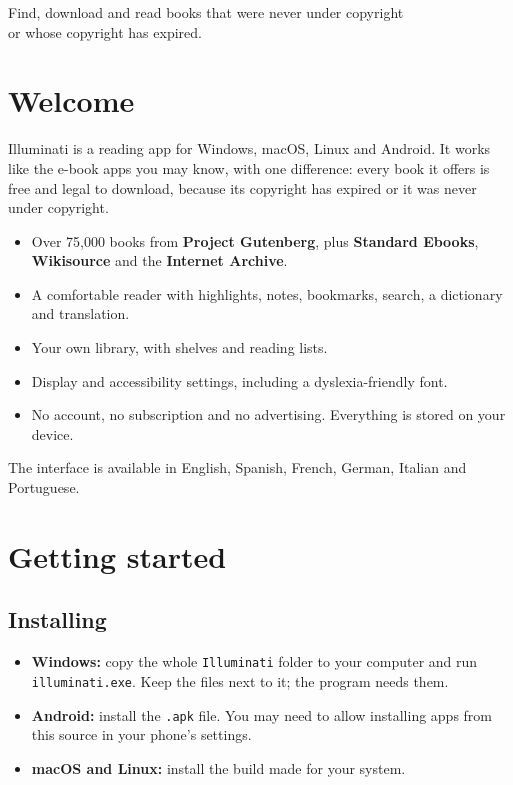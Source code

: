 \documentclass[11pt]{article}
\begin{document}
%
  {Find, download and read books that were never under copyright\\or whose copyright has expired.}

{\setcounter{tocdepth}{1}\tableofcontents}
\newpage

\section{Welcome}

Illuminati is a reading app for Windows, macOS, Linux and Android. It works like the e-book
apps you may know, with one difference: every book it offers is free and legal to download,
because its copyright has expired or it was never under copyright.

\begin{itemize}
  \item Over 75,000 books from \textbf{Project Gutenberg}, plus \textbf{Standard Ebooks},
        \textbf{Wikisource} and the \textbf{Internet Archive}.
  \item A comfortable reader with highlights, notes, bookmarks, search, a dictionary and
        translation.
  \item Your own library, with shelves and reading lists.
  \item Display and accessibility settings, including a dyslexia-friendly font.
  \item No account, no subscription and no advertising. Everything is stored on your device.
\end{itemize}

The interface is available in English, Spanish, French, German, Italian and Portuguese.

\section{Getting started}

\subsection{Installing}
\begin{itemize}
  \item \textbf{Windows:} copy the whole \texttt{Illuminati} folder to your computer and run
        \texttt{illuminati.exe}. Keep the files next to it; the program needs them.
  \item \textbf{Android:} install the \texttt{.apk} file. You may need to allow installing apps
        from this source in your phone's settings.
  \item \textbf{macOS and Linux:} install the build made for your system.
\end{itemize}
\end{document}
